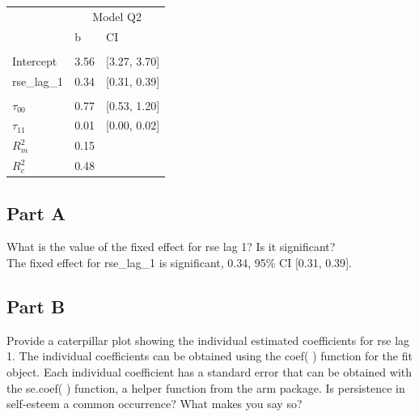 \documentclass[]{article}
\begin{document}
\begin{table}[H]
\centering
\begin{tabular}{lll}
\toprule
\multicolumn{1}{c}{ } & \multicolumn{2}{c}{Model Q2} \\
\cmidrule(l{2pt}r{2pt}){2-3}
 & b & CI\\
\midrule
\addlinespace[0.3em]
\multicolumn{3}{l}{\textbf{Fixed}}\\
\hspace{1em}Intercept & 3.56 & [3.27, 3.70]\\
\hspace{1em}rse\_lag\_1 & 0.34 & [0.31, 0.39]\\
\addlinespace[0.3em]
\multicolumn{3}{l}{\textbf{Random}}\\
\hspace{1em}$\tau_{00}$ & 0.77 & [0.53, 1.20]\\
\hspace{1em}$\tau_{11}$ & 0.01 & [0.00, 0.02]\\
$R^2_m$ & 0.15 & \\
$R^2_c$ & 0.48 & \\
\bottomrule
\end{tabular}
\end{table}

\subsection{Part A}\label{part-a}

What is the value of the fixed effect for rse lag 1? Is it
significant?\\
The fixed effect for rse\_lag\_1 is significant, 0.34, 95\% CI {[}0.31,
0.39{]}.

\subsection{Part B}\label{part-b}

Provide a caterpillar plot showing the individual estimated coefficients
for rse lag 1. The individual coefficients can be obtained using the
coef( ) function for the fit object. Each individual coefficient has a
standard error that can be obtained with the se.coef( ) function, a
helper function from the arm package. Is persistence in self-esteem a
common occurrence? What makes you say so?
\end{document}
